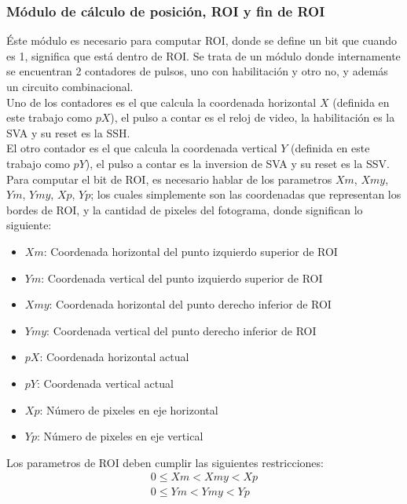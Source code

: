 \documentclass[twoside,spanish,ESP,MSc]{plantillaLabUPV}
\theoremstyle{definition}
\begin{document}
\subsubsection{Módulo de cálculo de posición, ROI y fin de ROI}
Éste módulo es necesario para computar ROI, donde se define un bit que cuando es 1, significa que está dentro de ROI. Se trata de un módulo donde internamente se encuentran 2 contadores de pulsos, uno con habilitación y otro no, y además un circuito combinacional.\\

Uno de los contadores es el que calcula la coordenada horizontal $X$ (definida en este trabajo como $pX$), el pulso a contar es el reloj de video, la habilitación es la SVA y su reset es la SSH.\\

El otro contador es el que calcula la coordenada vertical $Y$ (definida en este trabajo como $pY$), el pulso a contar es la inversion de SVA y su reset es la SSV.\\

Para computar el bit de ROI, es necesario hablar de los parametros $Xm$, $Xmy$, $Ym$, $Ymy$, $Xp$, $Yp$;  los cuales simplemente son las coordenadas que representan los bordes de ROI, y la cantidad de pixeles del fotograma, donde significan lo siguiente:

\begin{itemize}
\item $Xm$: Coordenada horizontal del punto izquierdo superior de ROI
\item $Ym$: Coordenada vertical del punto izquierdo superior de ROI
\item $Xmy$: Coordenada horizontal del punto derecho inferior de ROI
\item $Ymy$: Coordenada vertical del punto derecho inferior de ROI
\item $pX$: Coordenada horizontal actual
\item $pY$: Coordenada vertical actual
\item $Xp$: Número de pixeles en eje horizontal
\item $Yp$: Número de pixeles en eje vertical 
\end{itemize}

Los parametros de ROI deben cumplir las siguientes restricciones: %
\begin{equation} \label{rois}
\begin{gathered} 
0 \leq Xm < Xmy < Xp \\
0 \leq Ym < Ymy < Yp 
\end{gathered}
\end{equation}
\end{document}
